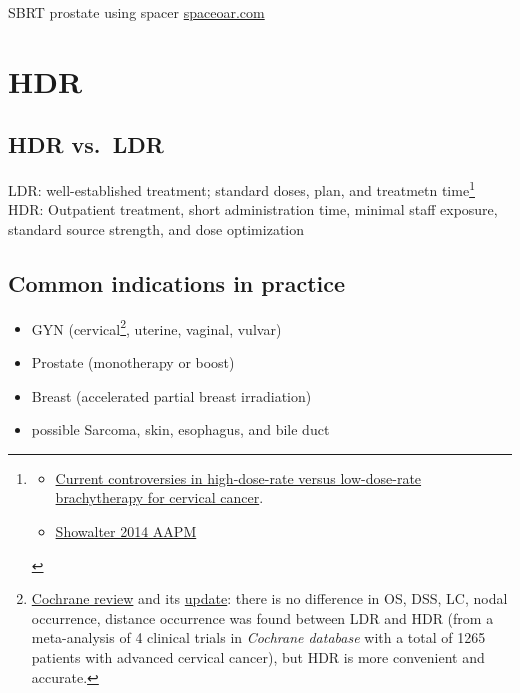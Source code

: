 \documentclass[]{book}
\providecommand{\tightlist}{%
  \setlength{\itemsep}{0pt}\setlength{\parskip}{0pt}}
\let\rmarkdownfootnote\footnote%
\def\footnote{\protect\rmarkdownfootnote}
\theoremstyle{definition}
\theoremstyle{definition}
\theoremstyle{definition}
\theoremstyle{remark}
\begin{document}
SBRT prostate using spacer
\href{https://www.spaceoar.com/physicians/clinical-publications/}{spaceoar.com}

\chapter{HDR}\label{hdr}

\section{HDR vs.~LDR}\label{hdr-vs.ldr}

LDR: well-established treatment; standard doses, plan, and treatmetn
time\footnote{\begin{itemize}
  \tightlist
  \item
    \href{https://www.ncbi.nlm.nih.gov/pubmed/16874815}{Current
    controversies in high-dose-rate versus low-dose-rate brachytherapy
    for cervical cancer}.
  \item
    \href{https://www.aapm.org/education/vl/vl.asp?id=3911\%5D}{Showalter
    2014 AAPM}
  \end{itemize}}\\
HDR: Outpatient treatment, short administration time, minimal staff
exposure, standard source strength, and dose optimization

\section{Common indications in
practice}\label{common-indications-in-practice}

\begin{itemize}
\tightlist
\item
  GYN (cervical\footnote{\href{http://cochranelibrary-wiley.com/doi/10.1002/14651858.CD007563.pub2/abstract}{Cochrane
    review} and its
    \href{https://www.ncbi.nlm.nih.gov/m/pubmed/25300170/?i=5\&from=/10432431/related}{update}:
    there is no difference in OS, DSS, LC, nodal occurrence, distance
    occurrence was found between LDR and HDR (from a meta-analysis of 4
    clinical trials in \emph{Cochrane database} with a total of 1265
    patients with advanced cervical cancer), but HDR is more convenient
    and accurate.}, uterine, vaginal, vulvar)
\item
  Prostate (monotherapy or boost)
\item
  Breast (accelerated partial breast irradiation)
\item
  possible Sarcoma, skin, esophagus, and bile duct
\end{itemize}
\end{document}
